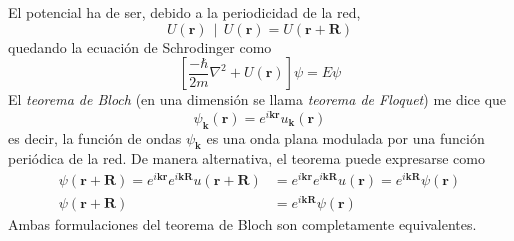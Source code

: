 El potencial ha de ser, debido a la periodicidad de la red,
\begin{equation}
  U(\mathbf{r}) \ \ | \ \  U(\mathbf{r}) = U(\mathbf{r}+\mathbf{R})
\end{equation}
quedando la ecuación de Schrodinger como
\begin{equation}
  \left[ \frac{-\hbar}{2m} \nabla ^2 + U(\mathbf{r}) \right] \psi = E \psi
\end{equation}
El \emph{teorema de Bloch} (en una dimensión se llama \emph{teorema de
Floquet}) me dice que
\begin{equation}
  \boxed{
  \psi_\mathbf{k}(\mathbf{r}) = e^{i \mathbf{k} \mathbf{r}}
  u_\mathbf{k}(\mathbf{r})  }
\end{equation}
es decir, la función de ondas $\psi_\mathbf{k}$ es una onda plana
modulada por una función periódica de la red. De manera alternativa,
el teorema puede expresarse como
\begin{equation}
  \begin{split}
    \psi(\mathbf{r}+\mathbf{R}) = e^{i \mathbf{k}\mathbf{r}}e^{i
      \mathbf{k}\mathbf{R}} u(\mathbf{r}+\mathbf{R}) &=    e^{i \mathbf{k}\mathbf{r}}e^{i
      \mathbf{k}\mathbf{R}} u(\mathbf{r}) = e^{i \mathbf{k}\mathbf{R}}
    \psi(\mathbf{r}) \\
   \psi(\mathbf{r}+\mathbf{R}) &= e^{i \mathbf{k} \mathbf{R}}
  \psi(\mathbf{r})
  \end{split}
\end{equation}
Ambas formulaciones del teorema de Bloch son completamente equivalentes.

